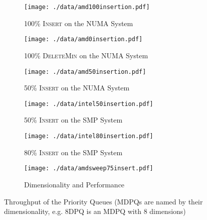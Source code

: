 \documentclass[10pt,journal,letterpaper,compsoc]{IEEEtran}
\begin{document}
\begin{figure*}[t]
    \begin{subfigure}{0.33\textwidth}
        \centering
        \texttt{[image: ./data/amd100insertion.pdf]}
        \caption{100\% \textsc{Insert} on the NUMA System}
        \label{fig:100ins}
    \end{subfigure}
    \hfill
    \begin{subfigure}{0.33\textwidth}
        \centering
        \texttt{[image: ./data/amd0insertion.pdf]}
        \caption{100\% \textsc{DeleteMin} on the NUMA System}
        \label{fig:0ins}
    \end{subfigure}
    \hfill
    \begin{subfigure}{0.33\textwidth}
        \centering
        \texttt{[image: ./data/amd50insertion.pdf]}
        \caption{50\% \textsc{Insert} on the NUMA System}
        \label{fig:50ins}
    \end{subfigure}
    \begin{subfigure}{0.33\textwidth}
        \centering
        \texttt{[image: ./data/intel50insertion.pdf]}
        \caption{50\% \textsc{Insert} on the SMP System}
        \label{fig:50insintel}
    \end{subfigure}
    \hfill
    \begin{subfigure}{0.33\textwidth}
        \centering
        \texttt{[image: ./data/intel80insertion.pdf]}
        \caption{80\% \textsc{Insert} on the SMP System}
        \label{fig:80ins}
    \end{subfigure}
    \hfill
    \begin{subfigure}{0.33\textwidth}
        \centering
        \texttt{[image: ./data/amdsweep75insert.pdf]}
        \caption{Dimensionality and Performance}
        \label{fig:sweep}
    \end{subfigure}
    \caption{Throughput of the Priority Queues (MDPQs are named by their dimensionality, e.g. 8DPQ is an MDPQ with 8 dimensions)}
    \label{fig:throughput}
\end{figure*}
\end{document}
